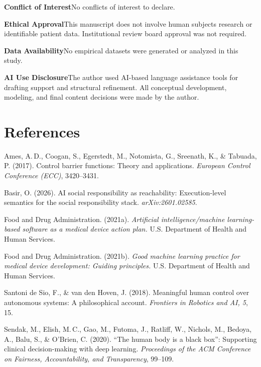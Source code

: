 \documentclass[12pt]{article}
\begin{document}
\noindent\textbf{Conflict of Interest}\quad No conflicts of interest to declare.

\noindent\textbf{Ethical Approval}\quad This manuscript does not involve human subjects
research or identifiable patient data. Institutional review board approval was not required.

\noindent\textbf{Data Availability}\quad No empirical datasets were generated or analyzed
in this study.

\noindent\textbf{AI Use Disclosure}\quad The author used AI-based language assistance tools
for drafting support and structural refinement. All conceptual development, modeling, and
final content decisions were made by the author.

\section*{References}

\begin{description}[leftmargin=1cm, labelindent=0cm, itemsep=4pt]

\item Ames, A.\,D., Coogan, S., Egerstedt, M., Notomista, G., Sreenath, K., \& Tabuada, P.
(2017). Control barrier functions: Theory and applications.
\textit{European Control Conference (ECC)}, 3420--3431.

\item Basir, O. (2026). AI social responsibility as reachability: Execution-level semantics
for the social responsibility stack. \textit{arXiv:2601.02585}.

\item Food and Drug Administration. (2021a). \textit{Artificial intelligence/machine
learning-based software as a medical device action plan.}
U.S. Department of Health and Human Services.

\item Food and Drug Administration. (2021b). \textit{Good machine learning practice for
medical device development: Guiding principles.}
U.S. Department of Health and Human Services.

\item Santoni de Sio, F., \& van den Hoven, J. (2018). Meaningful human control over
autonomous systems: A philosophical account.
\textit{Frontiers in Robotics and AI, 5}, 15.

\item Sendak, M., Elish, M.\,C., Gao, M., Futoma, J., Ratliff, W., Nichols, M.,
Bedoya, A., Balu, S., \& O'Brien, C. (2020).
``The human body is a black box'': Supporting clinical decision-making with deep learning.
\textit{Proceedings of the ACM Conference on Fairness, Accountability, and Transparency},
99--109.

\end{description}
\end{document}
